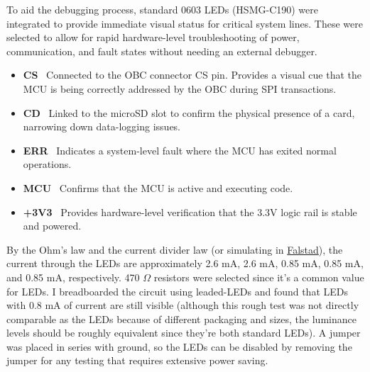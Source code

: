 To aid the debugging process, standard 0603 LEDs (HSMG-C190) were integrated to provide immediate visual status for critical system lines. These were selected to allow for rapid hardware-level troubleshooting of power, communication, and fault states without needing an external debugger.

\begin{itemize}
    \item \textbf{CS} \
    Connected to the OBC connector CS pin. Provides a visual cue that the MCU is being correctly addressed by the OBC during SPI transactions.
    \item \textbf{CD} \
    Linked to the microSD slot to confirm the physical presence of a card, narrowing down data-logging issues.
    \item \textbf{ERR} \
    Indicates a system-level fault where the MCU has exited normal operations.
    \item \textbf{MCU} \
    Confirms that the MCU is active and executing code.
    \item \textbf{+3V3} \
    Provides hardware-level verification that the 3.3V logic rail is stable and powered.
\end{itemize}

By the Ohm's law and the current divider law (or simulating in \href{https://www.falstad.com/circuit/}{Falstad}), the current through the LEDs are approximately 2.6 mA, 2.6 mA, 0.85 mA, 0.85 mA, and 0.85 mA, respectively. 470 $\Omega$ resistors were selected since it's a common value for LEDs. I breadboarded the circuit using leaded-LEDs and found that LEDs with 0.8 mA of current are still visible (although this rough test was not directly comparable as the LEDs because of different packaging and sizes, the luminance levels should be roughly equivalent since they're both standard LEDs).
\nl
A jumper was placed in series with ground, so the LEDs can be disabled by removing the jumper for any testing that requires extensive power saving.